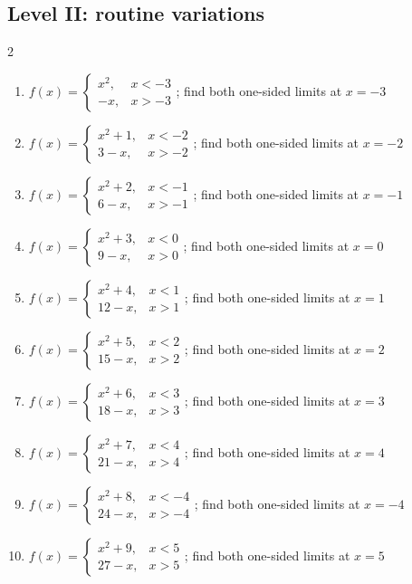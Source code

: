 \documentclass[11pt,oneside]{book}
\begin{document}
\subsection*{Level II: routine variations}
\begin{multicols}{2}
\begin{enumerate}[leftmargin=*,label=\textbf{\arabic*.},itemsep=0.65\baselineskip]
\item $f(x)=\begin{cases} x^{2}, & x<-3\\ - x, & x>-3 \end{cases}$; find both one-sided limits at $x=-3$
\item $f(x)=\begin{cases} x^{2} + 1, & x<-2\\ 3 - x, & x>-2 \end{cases}$; find both one-sided limits at $x=-2$
\item $f(x)=\begin{cases} x^{2} + 2, & x<-1\\ 6 - x, & x>-1 \end{cases}$; find both one-sided limits at $x=-1$
\item $f(x)=\begin{cases} x^{2} + 3, & x<0\\ 9 - x, & x>0 \end{cases}$; find both one-sided limits at $x=0$
\item $f(x)=\begin{cases} x^{2} + 4, & x<1\\ 12 - x, & x>1 \end{cases}$; find both one-sided limits at $x=1$
\item $f(x)=\begin{cases} x^{2} + 5, & x<2\\ 15 - x, & x>2 \end{cases}$; find both one-sided limits at $x=2$
\item $f(x)=\begin{cases} x^{2} + 6, & x<3\\ 18 - x, & x>3 \end{cases}$; find both one-sided limits at $x=3$
\item $f(x)=\begin{cases} x^{2} + 7, & x<4\\ 21 - x, & x>4 \end{cases}$; find both one-sided limits at $x=4$
\item $f(x)=\begin{cases} x^{2} + 8, & x<-4\\ 24 - x, & x>-4 \end{cases}$; find both one-sided limits at $x=-4$
\item $f(x)=\begin{cases} x^{2} + 9, & x<5\\ 27 - x, & x>5 \end{cases}$; find both one-sided limits at $x=5$
\end{enumerate}
\end{multicols}
\end{document}
